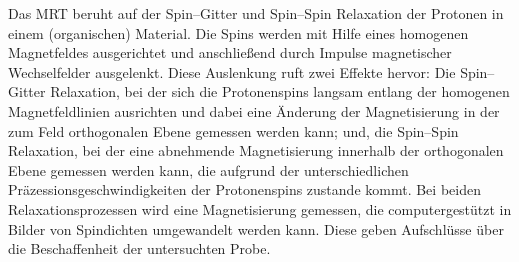 \documentclass[sn-mathphys-num,iicol]{sn-jnl}
\theoremstyle{thmstyleone}
\theoremstyle{thmstyletwo}
\theoremstyle{thmstylethree}
\begin{document}
Das MRT beruht auf der Spin--Gitter und Spin--Spin Relaxation der Protonen in einem (organischen) Material.
Die Spins werden mit Hilfe eines homogenen Magnetfeldes ausgerichtet und anschließend durch Impulse magnetischer Wechselfelder ausgelenkt.
Diese Auslenkung ruft zwei Effekte hervor:
Die Spin--Gitter Relaxation, bei der sich die Protonenspins langsam entlang der homogenen Magnetfeldlinien ausrichten und dabei eine Änderung der Magnetisierung in der zum Feld orthogonalen Ebene gemessen werden kann;
und, die Spin--Spin Relaxation, bei der eine abnehmende Magnetisierung innerhalb der orthogonalen Ebene gemessen werden kann, die aufgrund der unterschiedlichen Präzessionsgeschwindigkeiten der Protonenspins zustande kommt.
Bei beiden Relaxationsprozessen wird eine Magnetisierung gemessen, die computergestützt in Bilder von Spindichten umgewandelt werden kann.
Diese geben Aufschlüsse über die Beschaffenheit der untersuchten Probe.


\end{document}
